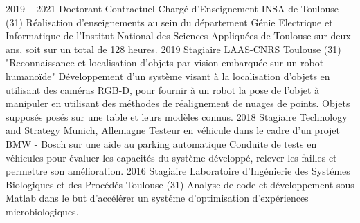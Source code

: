 \documentclass[11pt,a4paper,sans]{moderncv}         %
\begin{document}
%
\cventry
{2019 -- 2021}
{Doctorant Contractuel Charg\'e d'Enseignement}
{INSA de Toulouse (31)}
{}
{}
{
  R\'ealisation d'enseignements au sein du d\'epartement G\'enie Electrique et Informatique de l'Institut National des Sciences Appliqu\'ees de Toulouse sur deux ans, soit sur un total de 128 heures.
}
%
\cventry
{2019}
{Stagiaire}
{LAAS-CNRS}
{Toulouse (31)}
{"Reconnaissance et localisation d'objets par vision embarqu\'ee sur un robot humano\"ide"}
{
  Développement d'un système visant à la localisation d'objets en utilisant des cam\'eras RGB-D, pour fournir \`a un robot la pose de l'objet \`a manipuler en utilisant des m\'ethodes de r\'ealignement de nuages de points.
  Objets suppos\'es pos\'es sur une table et leurs mod\`eles connus.
}
%
%
\cventry
{2018}
{Stagiaire}
{Technology and Strategy}
{Munich, Allemagne}
{Testeur en v\'ehicule dans le cadre d'un projet BMW - Bosch sur une aide au parking automatique}
{
  Conduite de tests en v\'ehicules pour \'evaluer les capacit\'es du syst\`eme d\'evelopp\'e, relever les failles et permettre son am\'elioration.
}
%
%
\cventry
{2016}
{Stagiaire}
{Laboratoire d'Ing\'enierie des Syst\'emes Biologiques et des Proc\'ed\'es}
{Toulouse (31)}
{}
{
  Analyse de code et d\'eveloppement sous Matlab dans le but d'acc\'el\'erer un syst\'eme d'optimisation d'exp\'eriences microbiologiques.
}
%
\end{document}
